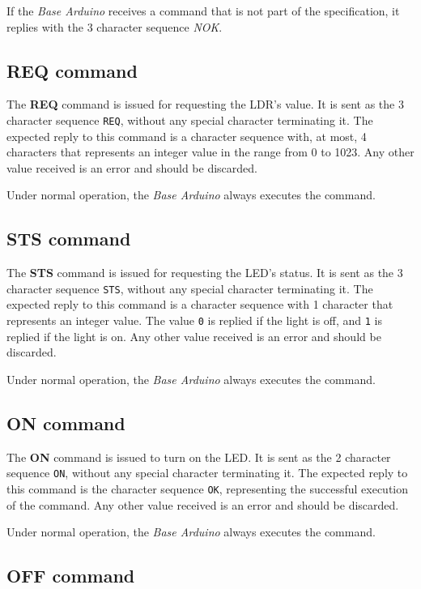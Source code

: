 \documentclass[conference, a4paper]{IEEEtran}
\begin{document}
If the \textit{Base Arduino} receives a command that is not part of the specification, it replies with the 3 character sequence \textit{NOK}.

\subsection{REQ command}

The \textbf{REQ} command is issued for requesting the LDR's value. It is sent as the 3 character sequence \texttt{REQ}, without any special character terminating it. The expected reply to this command is a character sequence with, at most, 4 characters that represents an integer value in the range from 0 to 1023. Any other value received is an error and should be discarded.

Under normal operation, the \textit{Base Arduino} always executes the command.

\subsection{STS command}

The \textbf{STS} command is issued for requesting the LED's status. It is sent as the 3 character sequence \texttt{STS}, without any special character terminating it. The expected reply to this command is a character sequence with 1 character that represents an integer value. The value \texttt{0} is replied if the light is off, and \texttt{1} is replied if the light is on. Any other value received is an error and should be discarded.

Under normal operation, the \textit{Base Arduino} always executes the command.

\subsection{ON command}

The \textbf{ON} command is issued to turn on the LED. It is sent as the 2 character sequence \texttt{ON}, without any special character terminating it. The expected reply to this command is the character sequence \texttt{OK}, representing the successful execution of the command. Any other value received is an error and should be discarded.

Under normal operation, the \textit{Base Arduino} always executes the command.

\subsection{OFF command}
\end{document}
